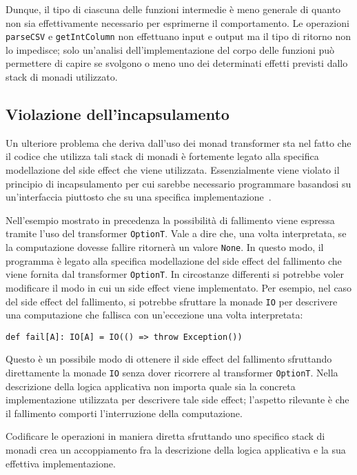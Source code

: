 Dunque, il tipo di ciascuna delle funzioni intermedie è meno generale di quanto non sia effettivamente necessario per esprimerne il comportamento. Le operazioni \lstinline{parseCSV} e \lstinline{getIntColumn} non effettuano input e output ma il tipo di ritorno non lo impedisce; solo un'analisi dell'implementazione del corpo delle funzioni può permettere di capire se svolgono o meno uno dei determinati effetti previsti dallo stack di monadi utilizzato.

\subsection{Violazione dell'incapsulamento}
Un ulteriore problema che deriva dall'uso dei monad transformer sta nel fatto che il codice che utilizza tali stack di monadi è fortemente legato alla specifica modellazione del side effect che viene utilizzata. Essenzialmente viene violato il principio di incapsulamento per cui sarebbe necessario programmare basandosi su un'interfaccia piuttosto che su una specifica implementazione~\cite[p.~94]{cit:clean-code-a-handbook-of-agile-software-craftsmanship}.

Nell'esempio mostrato in precedenza la possibilità di fallimento viene espressa tramite l'uso del transformer \lstinline{OptionT}. Vale a dire che, una volta interpretata, se la computazione dovesse fallire ritornerà un valore \lstinline{None}. In questo modo, il programma è legato alla specifica modellazione del side effect del fallimento che viene fornita dal transformer \lstinline{OptionT}.
In circostanze differenti si potrebbe voler modificare il modo in cui un side effect viene implementato. Per esempio, nel caso del side effect del fallimento, si potrebbe sfruttare la monade \lstinline{IO} per descrivere una computazione che fallisca con un'eccezione una volta interpretata:
\begin{lstlisting}[language=scala3]
def fail[A]: IO[A] = IO(() => throw Exception())
\end{lstlisting}
Questo è un possibile modo di ottenere il side effect del fallimento sfruttando direttamente la monade \lstinline{IO} senza dover ricorrere al transformer \lstinline{OptionT}. Nella descrizione della logica applicativa non importa quale sia la concreta implementazione utilizzata per descrivere tale side effect; l'aspetto rilevante è che il fallimento comporti l'interruzione della computazione.

Codificare le operazioni in maniera diretta sfruttando uno specifico stack di monadi crea un accoppiamento fra la descrizione della logica applicativa e la sua effettiva implementazione.
